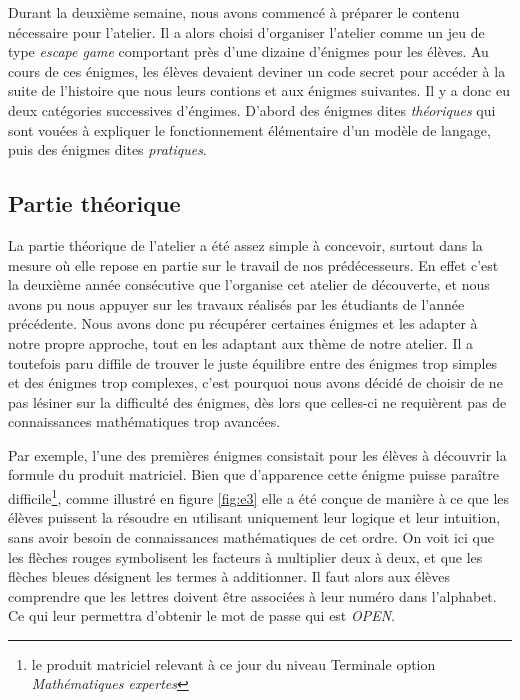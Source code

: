   Durant la deuxième semaine, nous avons commencé à préparer le contenu nécessaire pour l'atelier. Il a alors choisi d'organiser l'atelier comme un jeu de type \textit{escape game} comportant près d'une dizaine d'énigmes pour les élèves. Au cours de ces énigmes, les élèves devaient deviner un code secret pour accéder à la suite de l'histoire que nous leurs contions et aux énigmes suivantes. Il y a donc eu deux catégories successives d'éngimes. D'abord des énigmes dites \textit{théoriques} qui sont vouées à expliquer le fonctionnement élémentaire d'un modèle de langage, puis des énigmes dites \textit{pratiques}.


\subsection{Partie théorique}

  La partie théorique de l'atelier a été assez simple à concevoir, surtout dans la mesure où elle repose en partie sur le travail de nos prédécesseurs. En effet c'est la deuxième année consécutive que l'\enseirb organise cet atelier de découverte, et nous avons pu nous appuyer sur les travaux réalisés par les étudiants de l'année précédente. Nous avons donc pu récupérer certaines énigmes et les adapter à notre propre approche, tout en les adaptant aux thème de notre atelier. Il a toutefois paru diffile de trouver le juste équilibre entre des énigmes trop simples et des énigmes trop complexes, c'est pourquoi nous avons décidé de choisir de ne pas lésiner sur la difficulté des énigmes, dès lors que celles-ci ne requièrent pas de connaissances mathématiques trop avancées.

  Par exemple, l'une des premières énigmes consistait pour les élèves à découvrir la formule du produit matriciel. Bien que d'apparence cette énigme puisse paraître difficile\footnote{le produit matriciel relevant à ce jour du niveau Terminale option \textit{Mathématiques expertes}}, comme illustré en figure \ref{fig:e3} elle a été conçue de manière à ce que les élèves puissent la résoudre en utilisant uniquement leur logique et leur intuition, sans avoir besoin de connaissances mathématiques de cet ordre. On voit ici que les flèches rouges symbolisent les facteurs à multiplier deux à deux, et que les flèches bleues désignent les termes à additionner. Il faut alors aux élèves comprendre que les lettres doivent être associées à leur numéro dans l'alphabet. Ce qui leur permettra d'obtenir le mot de passe qui est \textit{OPEN}.\par

